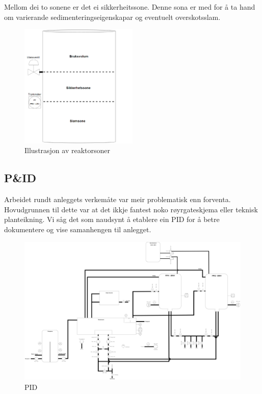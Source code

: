 Mellom dei to sonene er det ei sikkerheitssone.
Denne sona er med for å ta hand om varierande sedimenteringseigenskapar
og eventuelt overskotsslam.\newline

\begin{figure}[htbp]
    \centering
    \includegraphics[width=0.5\textwidth]{Figurar/Reaktorsoner.png}
    \caption{Illustrasjon av reaktorsoner}\label{fig:Reaktorsonar}
\end{figure}

\subsection{P\&ID}

Arbeidet rundt anleggets verkemåte var meir problematisk enn forventa.
Hovudgrunnen til dette var at det ikkje fantest noko røyrgateskjema eller teknisk planteikning. \newline
Vi såg det som naudsynt å etablere ein \gls{PID} for å betre dokumentere og vise samanhengen til anlegget.

\begin{figure}[htbp]
    \centering
    \includegraphics[angle=90,width=1\textwidth]{Figurar/PID.drawio.png}
    \caption{\gls{PID}}\label{fig:HMI}
\end{figure}